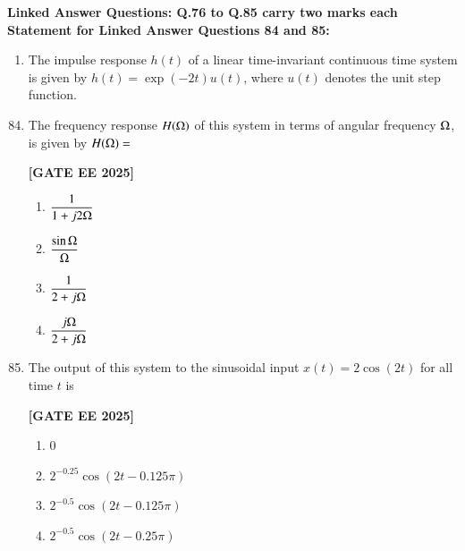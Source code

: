 \documentclass[12pt]{article}
\begin{document}
\vspace{1em}
 \large \textbf {Linked Answer Questions: Q.76 to Q.85 carry two marks each}
 \large \textbf {Statement for Linked Answer Questions 84 and 85: }
\vspace{1em}
\begin{enumerate}
\item The impulse response $h(t)$ of a linear time-invariant continuous time system is given by
$h(t) = \exp(-2 t) u(t)$, where $u(t)$ denotes the unit step function.
\end{enumerate}
\begin{enumerate}[leftmargin=*, label=\textbf{Q.\arabic*:}]
\setcounter{enumi}{83}

\item The frequency response $H(\ohm)$ of this system in terms of angular frequency $\ohm$, is given by $H(\ohm) = $
 
\noindent \textbf{[GATE EE 2025]}
\begin{enumerate}
  \item $\dfrac{1}{1 + j2\ohm}$
  \item $\dfrac{\sin \ohm}{\ohm}$
  \item $\dfrac{1}{2 + j\ohm}$
  \item $\dfrac{j\ohm}{2 + j\ohm}$
\end{enumerate}

\item The output of this system to the sinusoidal input $x(t) = 2 \cos (2t)$ for all time $t$ is
 
\noindent \textbf{[GATE EE 2025]}
\begin{enumerate}
  \item $0$
  \item $2^{-0.25} \cos (2t - 0.125\pi)$
  \item $2^{-0.5} \cos (2t - 0.125\pi)$
  \item $2^{-0.5} \cos (2t - 0.25\pi)$
\end{enumerate}

\end{enumerate}
\end{document}
